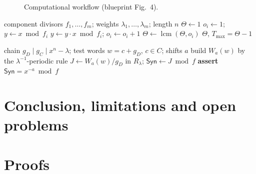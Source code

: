 \documentclass[11pt]{article}
\theoremstyle{definition}
\theoremstyle{remark}
\theoremstyle{plain}
\newcommand{\lcm}{\operatorname{lcm}}
\newcommand{\Tol}{T}
\newcommand{\Th}{\Theta}
\newcommand{\Syn}{\mathsf{Syn}}
\begin{document}
\begin{figure}[t]\centering
{}
\caption{Computational workflow (blueprint Fig.~4).}
\end{figure}

\begin{algorithm}[t]
\caption{Tolerance invariant $\Th$ and maximal window (exact arithmetic).}
\begin{algorithmic}[1]
\Require component divisors $f_1,\dots,f_m$; weights $\lambda_1,\dots,\lambda_m$; length $n$
\State $\Th\gets1$
  \State $o_i\gets1$; $y\gets x\bmod f_i$
   
     \State $y\gets y\cdot x\bmod f_i$; $o_i\gets o_i+1$
  \EndWhile
  \State $\Th\gets\lcm(\Th,o_i)$
\EndFor
\State \Return $\Th$, $\Tol_{\max}=\Th-1$
\end{algorithmic}
\end{algorithm}

\begin{algorithm}[t]
\caption{Window syndrome identity check (verification task T7).}
\begin{algorithmic}[1]
\Require chain $g_D\mid g_C\mid x^n-\lambda$; test words $w=c+g_D$, $c\in C$; shifts $a$
  \State build $W_a(w)$ by the $\lambda^{-1}$-periodic rule
  \State $J\gets W_a(w)/g_D$ in $R_\lambda$; \quad $\Syn\gets J\bmod f$
  \State \textbf{assert} $\Syn=x^{-a}\bmod f$ 
\EndFor
\end{algorithmic}
\end{algorithm}

\section{Conclusion, limitations and open problems}\label{sec:conclusion}

\appendix
\section{Proofs}\label{app:proofs}
\end{document}

